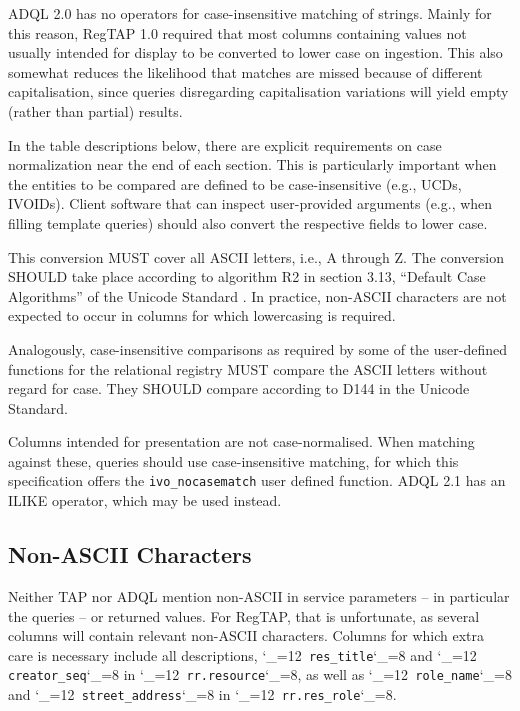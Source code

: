 \documentclass[11pt,a4paper]{ivoa}
\makeatletter
\def\rtent#1{\texttt{\color{rtcolor}\verb|#1|}}
\def\makeunderscoreletter{\catcode`\_=12}
\def\makeunderscoresubscript{\catcode`\_=8}
\def\rtent{\makeunderscoreletter\relax\rt@nt}
\def\rt@nt#1{\texttt{\color{rtcolor} #1}\makeunderscoresubscript{}}
\makeatother
\begin{document}
\label{casenorm}

ADQL 2.0 has no operators for case-insensitive matching of strings.
Mainly for this reason, RegTAP 1.0 required that most columns
containing values not usually intended for display to be
converted to lower case on ingestion.  This also somewhat reduces the
likelihood that matches are missed because of different capitalisation,
since queries disregarding capitalisation variations will yield empty
(rather than partial) results.

In the table descriptions below, there are
explicit requirements on case normalization near the end of each
section.  This is particularly important when the entities to be
compared are defined to be case-insensitive (e.g., UCDs, IVOIDs).
Client software that can inspect user-provided arguments (e.g., when
filling template queries) should also convert the respective fields to
lower case.

This conversion MUST cover all ASCII letters, i.e., A through Z.
The conversion SHOULD take place according to
algorithm R2 in section 3.13, ``Default Case Algorithms'' of the Unicode
Standard
\citep{std:UNICODE}.  In practice, non-ASCII characters are not expected
to occur in columns for which lowercasing is required.

Analogously, case-insensitive comparisons as required by some of the
user-defined functions for the relational registry MUST compare
the ASCII letters without regard for case.  They SHOULD compare according
to D144 in the Unicode Standard.

Columns intended for presentation are not case-normalised.  When
matching against these, queries should use case-insensitive matching,
for which this specification offers the \verb|ivo_nocasematch| user
defined function.  ADQL 2.1 has an ILIKE operator,
which may be used instead.


\subsection{Non-ASCII Characters}

\label{utfreq}

Neither TAP nor ADQL mention non-ASCII in service parameters -- in
particular the queries -- or returned values.  For RegTAP, that is
unfortunate, as several columns will contain relevant non-ASCII
characters.  Columns for which extra care is necessary include all
descriptions, \rtent{res_title} and \rtent{creator_seq} in
\rtent{rr.resource}, as well as \rtent{role_name} and
\rtent{street_address} in \rtent{rr.res_role}.
\end{document}
